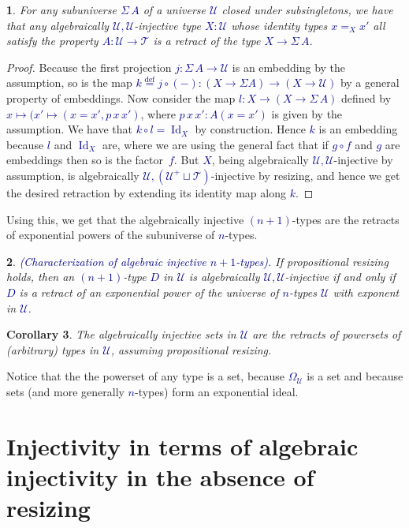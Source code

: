 \documentclass[10pt]{article}
\newcommand{\db}{\textcolor{darkblue}}
\newcommand{\df}[1]{\emph{\db{#1}}}
\newcommand{\m}[1]{\db{$#1$}}
\newcommand{\comp}{\mathrel{\circ}}
\newcommand{\U}{\mathcal{U}}
\newcommand{\T}{\mathcal{T}}
\newcommand{\Id}{\operatorname{Id}}
\newcommand{\eqdef}{\overset{\text{def}}{=}}
\newtheorem{numbered}{}
\newtheorem{corollary}[numbered]{Corollary}
\theoremstyle{definition}
\begin{document}
\begin{numbered}
  For any subuniverse \m{\Sigma \, A} of a universe \m{\U} closed
  under subsingletons, we have that any algebraically
  \m{\U,\U}-injective type \m{X:\U} whose identity types \m{x=_X x'}
  all satisfy the property \m{A:\U \to \T} is a retract of the type
  \m{X \to \Sigma \, A}.
\end{numbered}
\begin{proof}
  Because the first projection \m{j : \Sigma \, A \to \U} is an
  embedding by the assumption, so is the map \m{k \eqdef j \comp (-) :
    (X \to \Sigma A) \to (X \to \U)} by a general property of
  embeddings. Now consider the map \m{l : X \to (X \to \Sigma \, A)}
  defined by \m{x \mapsto (x' \mapsto (x=x', p \, x \, x')}, where
  \m{p \, x \, x' : A(x=x')} is given by the assumption. We have that
  \m{k \comp l = \Id_X} by construction. Hence \m{k} is an embedding
  because \m{l} and \m{\Id_X} are, where we are using the general fact
  that if \m{g \comp f} and \m{g} are embeddings then so is the
  factor~\m{f}.  But \m{X}, being algebraically \m{\U,\U}-injective by
  assumption, is algebraically \m{\U,(\U^+ \sqcup \T)}-injective by
  resizing, and hence we get the desired retraction by extending its
  identity map along \m{k}.
\end{proof}

Using this, we get that the algebraically injective \m{(n+1)}-types are the
retracts of exponential powers of the subuniverse of \m{n}-types.

\begin{numbered} \df{(Characterization of algebraic injective \m{n+1}-types).}  If propositional resizing holds, then an
  \m{(n+1)}-type \m{D} in \m{\U} is algebraically \m{\U,\U}-injective
  if and only if \m{D} is a retract of an exponential power of the
  universe of \m{n}-types \m{\U} with exponent in \m{\U}.
\end{numbered}

\begin{corollary}
  The algebraically injective sets in \m{\U} are the retracts of
  powersets of (arbitrary) types in \m{\U}, assuming propositional resizing.
\end{corollary}
\noindent Notice that the the powerset of any type is a set, because
\m{\Omega_\U} is a set and because sets (and more generally
\m{n}-types) form an exponential ideal.



\section{Injectivity in terms of algebraic injectivity in the absence of resizing}
\end{document}
